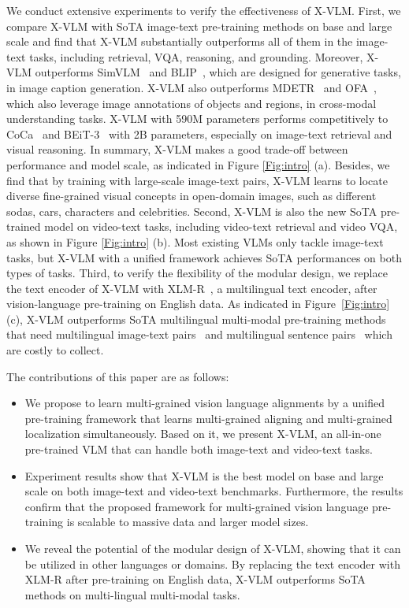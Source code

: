 \documentclass{article}
\newcommand{\baby}{X-VLM\xspace}
\newcommand{\babyL}{X-VLM\xspace}
\begin{document}
We conduct extensive experiments to verify the effectiveness of \baby. First, we compare \baby with SoTA image-text pre-training methods on base and large scale and find that \baby substantially outperforms all of them in the image-text tasks, including retrieval, VQA, reasoning, and grounding. Moreover, \baby outperforms SimVLM~\cite{wang2021simvlm} and BLIP~\cite{li2022blip}, which are designed for generative tasks, in image caption generation. \baby also outperforms MDETR~\cite{kamath2021mdetr} and OFA~\cite{wang2022ofa}, which also leverage image annotations of objects and regions, in cross-modal understanding tasks. \babyL with 590M parameters performs competitively to CoCa~\cite{yu2022coca} and BEiT-3~\cite{wang2022image} with 2B parameters, especially on image-text retrieval and visual reasoning. In summary, \baby makes a good trade-off between performance and model scale, as indicated in Figure \ref{Fig:intro} (a). Besides, we find that by training with large-scale image-text pairs, \baby learns to locate diverse fine-grained visual concepts in open-domain images, such as different sodas, cars, characters and celebrities. Second, \baby is also the new SoTA pre-trained model on video-text tasks, including video-text retrieval and video VQA, as shown in Figure \ref{Fig:intro} (b). Most existing VLMs only tackle image-text tasks, but \baby with a unified framework achieves SoTA performances on both types of tasks. Third, to verify the flexibility of the modular design, we replace the text encoder of \baby with XLM-R~\cite{conneau2020unsupervised}, a multilingual text encoder, after vision-language pre-training on English data. As indicated in Figure~\ref{Fig:intro} (c), \baby outperforms SoTA multilingual multi-modal pre-training methods that need multilingual image-text pairs~\cite{zhou2021uc2, jain2021mural} and multilingual sentence pairs~\cite{cclm} which are costly to collect. 


The contributions of this paper are as follows:
\begin{itemize}

\item We propose to learn multi-grained vision language alignments by a unified pre-training framework that learns multi-grained aligning and multi-grained localization simultaneously. Based on it, we present \baby, an all-in-one pre-trained VLM that can handle both image-text and video-text tasks. 

\item Experiment results show that \baby is the best model on base and large scale on both image-text and video-text benchmarks. Furthermore, the results confirm that the proposed framework for multi-grained vision language pre-training is scalable to massive data and larger model sizes.


\item  We reveal the potential of the modular design of \baby, showing that it can be utilized in other languages or domains. By replacing the text encoder with XLM-R after pre-training on English data, \baby outperforms SoTA methods on multi-lingual multi-modal tasks. 


\end{itemize}
\end{document}
